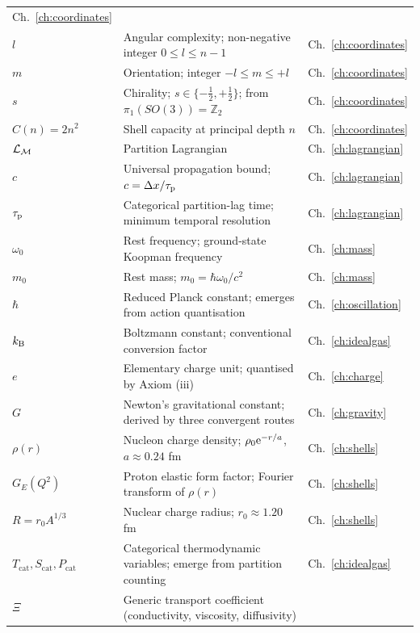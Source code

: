 \begin{longtable}{@{}lp{9cm}l@{}}
  Ch.~\ref{ch:coordinates} \\
$l$ & Angular complexity; non-negative integer $0\leq l\leq n-1$ &
  Ch.~\ref{ch:coordinates} \\
$m$ & Orientation; integer $-l\leq m\leq +l$ &
  Ch.~\ref{ch:coordinates} \\
$s$ & Chirality; $s\in\{-\tfrac{1}{2},+\tfrac{1}{2}\}$;
  from $\pi_{1}(SO(3))=\mathbb{Z}_{2}$ & Ch.~\ref{ch:coordinates} \\
$C(n)=2n^{2}$ & Shell capacity at principal depth $n$ &
  Ch.~\ref{ch:coordinates} \\
$\mathcal{L}_{\mathcal{M}}$ & Partition Lagrangian &
  Ch.~\ref{ch:lagrangian} \\
$c$ & Universal propagation bound; $c=\Delta x/\tau_{\mathrm{p}}$ &
  Ch.~\ref{ch:lagrangian} \\
$\tau_{\mathrm{p}}$ & Categorical partition-lag time; minimum temporal resolution &
  Ch.~\ref{ch:lagrangian} \\
$\omega_{0}$ & Rest frequency; ground-state Koopman frequency &
  Ch.~\ref{ch:mass} \\
$m_{0}$ & Rest mass; $m_{0}=\hbar\omega_{0}/c^{2}$ &
  Ch.~\ref{ch:mass} \\
$\hbar$ & Reduced Planck constant; emerges from action quantisation &
  Ch.~\ref{ch:oscillation} \\
$k_{\mathrm{B}}$ & Boltzmann constant; conventional conversion factor &
  Ch.~\ref{ch:idealgas} \\
$e$ & Elementary charge unit; quantised by Axiom (iii) &
  Ch.~\ref{ch:charge} \\
$G$ & Newton's gravitational constant; derived by three convergent routes &
  Ch.~\ref{ch:gravity} \\
$\rho(r)$ & Nucleon charge density; $\rho_{0}\mathrm{e}^{-r/a}$, $a\approx 0.24$ fm &
  Ch.~\ref{ch:shells} \\
$G_{E}(Q^{2})$ & Proton elastic form factor; Fourier transform of $\rho(r)$ &
  Ch.~\ref{ch:shells} \\
$R=r_{0}A^{1/3}$ & Nuclear charge radius; $r_{0}\approx 1.20$ fm &
  Ch.~\ref{ch:shells} \\
$T_{\text{cat}},S_{\text{cat}},P_{\text{cat}}$ & Categorical thermodynamic
  variables; emerge from partition counting & Ch.~\ref{ch:idealgas} \\
$\Xi$ & Generic transport coefficient (conductivity, viscosity, diffusivity) &

\end{longtable}
